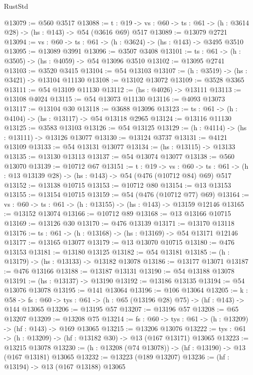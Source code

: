 \begin{lexlean}{RustStd}
\begin{coremodule}
@13079 := @560 @3517
@13088 := {t : @19} ->
  {vs : @60} -> {ts : @61} -> (h : @3614 @28) -> (hs : @143) -> @54 (@3616 @69) @517
@13089 := @13079 @2721
@13094 := {vs : @60} -> {ts : @61} -> (h : @3624) -> (hs : @143) -> @3495 @3510
@13095 := @13089 @3991
@13096 := @3507 @3408
@13101 := {ts : @61} -> (h : @3505) -> (hs : @4059) -> @54 @13096 @3510
@13102 := @13095 @2741
@13103 := @3520 @3415
@13104 := @54 @13103
@13107 := (h : @3519) -> (hs : @3421) -> @13104 @11130
@13108 := @13102 @13072
@13109 := @3528 @3365
@13111 := @54 @13109 @11130
@13112 := (hs : @4026) -> @13111
@13113 := @13108 @4024
@13115 := @54 @13073 @11130
@13116 := @4093 @13073
@13117 := @13104 @30
@13118 := @3688 @13096
@13123 := {ts : @61} -> (h : @4104) -> (hs : @13117) -> @54 @13118 @2965
@13124 := @13116 @11130
@13125 := @3583 @13103
@13126 := @54 @13125
@13129 := (h : @4114) -> (hs : @13111) -> @13126 @13077
@13130 := @13124 @3737
@13131 := @4121 @13109
@13133 := @54 @13131 @13077
@13134 := (hs : @13115) -> @13133
@13135 := @13130 @13113
@13137 := @54 @13074 @13077
@13138 := @560 @13070
@13139 := @10712 @67
@13151 := {t : @19} ->
  {vs : @60} ->
  {ts : @61} -> (h : @13 @13139 @28) -> (hs : @143) -> @54 (@476 (@10712 @84) @69) @517
@13152 := @13138 @10715
@13153 := @10712 @80
@13154 := @13 @13153
@13155 := @13154 @10715
@13159 := @54 (@476 (@10712 @77) @69)
@13164 := {vs : @60} -> {ts : @61} -> (h : @13155) -> (hs : @143) -> @13159 @12146
@13165 := @13152 @13074
@13166 := @10712 @89
@13168 := @13 @13166 @10715
@13169 := @13126 @30
@13170 := @476 @13139
@13171 := @13170 @13118
@13176 := {ts : @61} -> (h : @13168) -> (hs : @13169) -> @54 @13171 @12146
@13177 := @13165 @13077
@13179 := @13 @13070 @10715
@13180 := @476 @13153
@13181 := @13180 @13125
@13182 := @54 @13181
@13185 := (h : @13179) -> (hs : @13133) -> @13182 @13078
@13186 := @13177 @13071
@13187 := @476 @13166
@13188 := @13187 @13131
@13190 := @54 @13188 @13078
@13191 := (hs : @13137) -> @13190
@13192 := @13186 @13135
@13194 := @54 @13076 @13078
@13195 := @141 @13064
@13196 := @106 @13064
@13205 := {k : @58} ->
  {fs : @60} -> {tys : @61} -> (h : @65 (@13196 @28) @75) -> (hf : @143) -> @144 @13065
@13206 := @13195 @57
@13207 := @13196 @57
@13208 := @65 @13207
@13209 := @13208 @75
@13214 := {fs : @60} -> {tys : @61} -> (h : @13209) -> (hf : @143) -> @169 @13065
@13215 := @13206 @13076
@13222 := {tys : @61} -> (h : @13209) -> (hf : @13182 @30) -> @13 (@167 @13171) @13065
@13223 := @13215 @13078
@13230 := (h : @13208 (@74 @13078)) -> (hf : @13190) -> @13 (@167 @13181) @13065
@13232 := @13223 (@189 @13207)
@13236 := (hf : @13194) -> @13 (@167 @13188) @13065

\end{coremodule}
\end{lexlean}
